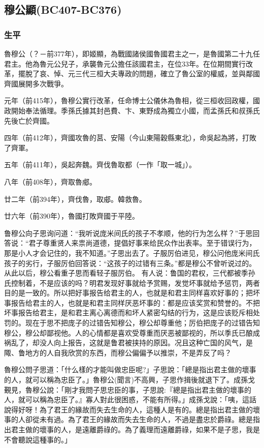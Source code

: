 
\subsection{穆公顯{\tiny(BC407-BC376)}}

\subsubsection{生平}

魯穆公（？－前377年），即姬顯，為戰國諸侯國魯國君主之一，是魯國第二十九任君主。他為魯元公兒子，承襲魯元公擔任該國君主，在位33年。在位期間實行改革，擺脫了哀、悼、元三代三桓大夫專政的問題，確立了魯公室的權威，並與鄰國齊國展開多次戰爭。

元年（前415年），魯穆公實行改革，任命博士公儀休為魯相，從三桓收回政權，國政開始奉法循理。季孫氏據其封邑費、卞、東野成為獨立小國，而孟孫氏和叔孫氏先後亡於齊國。

四年（前412年），齊國攻魯的莒、安陽（今山東陽穀縣東北），命吳起為將，打敗了齊軍。

五年（前411年），吳起奔魏。齊伐魯取都（一作「取一城」）。

八年（前408年），齊取魯郕。

廿二年（前394年），齊伐魯，取郕。韓救魯。

廿六年（前390年），魯國打敗齊國于平陸。

鲁穆公向子思询问道：“我听说庞{米间}氏的孩子不孝顺，他的行为怎么样？”于思回答说：“君子尊重贤人来祟尚道德，提倡好事来给民众作出表率。至于错误行为，那是小人才会记住的，我不知道。”子思出去了。子服厉伯进见，穆公问他庞{米间}氏孩子的劣行，子服厉伯回答说：“这孩子的过错有三条。”都是穆公不曾听说过的。从此以后，穆公看重子思而看轻子服厉伯。 有人说：鲁国的君权，三代都被季孙氏控制着，不是应该的吗？明君发现好事就给予赏赐，发觉坏事就给予惩罚，两者目的是一致的。所以把好事报告给君主的人，也就是和君主同样喜欢好事的；把坏事报告给君主的人，也就是和君主同样厌恶坏事的：都是应该奖赏和赞誉的。不把坏事报告给君主，是和君主离心离德而和坏人紧密勾结的行为，这是应该贬斥相处罚的。现在于思不把庞子的过错告知穆公，穆公却尊重他；厉伯把庞子的过错告知穆公，穆公却鄙视他。人的心情都是喜欢受尊重而厌恶被鄙视的，所以季氏已酿成祸乱了，却没人向上报告，这就是鲁君被挟持的原因。况且这种亡国的风气，是陬、鲁地方的人自我欣赏的东西，而穆公偏偏予以推崇，不是弄反了吗？

魯穆公問子思道：「什么樣的才能叫做忠臣呢?」子思說：「總是指出君主做的壞事的人，就可以稱為忠臣了。」魯穆公(聞言)不高興，子思作揖後就退下了。成孫戈覲見，魯穆公說：「剛才我問子思忠臣的事，子思說:『總是指出君主做的壞事的人，就可以稱為忠臣了。』寡人對此很困惑，不能有所得。」成孫戈說：「咦，這話說得好呀！為了君王的緣故而失去生命的人，這種人是有的。總是指出君主做的壞事的人卻從未有過。為了君王的緣故而失去生命的人，不過是盡忠於爵祿。總是指出君主做的壞事的人，是遠離爵祿的。為了義理而遠離爵祿，如果不是子思，我是不會聽說這種事的。」

